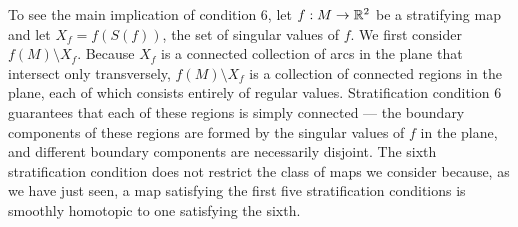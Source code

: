 
To see the main implication of condition 6, let $f:M\to\mathbb{R}^2$ be a stratifying map and let $X_f = f(S(f))$, the set of singular values of $f$.
We first consider $f(M)\setminus X_f$.
Because $X_f$ is a connected collection of arcs in the plane that intersect only transversely, $f(M)\setminus X_f$ is a collection of connected regions in the plane, each of which consists entirely of regular values.
Stratification condition 6 guarantees that each of these regions is simply connected --- the boundary components of these regions are formed by the singular values of $f$ in the plane, and different boundary components are necessarily disjoint.
The sixth stratification condition does not restrict the class of maps we consider because, as we have just seen, a map satisfying the first five stratification conditions is smoothly homotopic to one satisfying the sixth.


